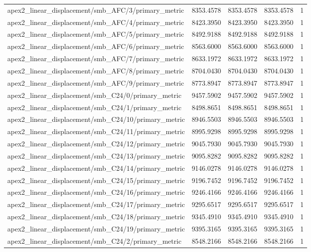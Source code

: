 \begin{table}[h]
\begin{tabular}{lrrrr}
apex2_linear_displacement/smb_AFC/3/primary_metric & 8353.4578 & 8353.4578 & 8353.4578 & 1 \\
apex2_linear_displacement/smb_AFC/4/primary_metric & 8423.3950 & 8423.3950 & 8423.3950 & 1 \\
apex2_linear_displacement/smb_AFC/5/primary_metric & 8492.9188 & 8492.9188 & 8492.9188 & 1 \\
apex2_linear_displacement/smb_AFC/6/primary_metric & 8563.6000 & 8563.6000 & 8563.6000 & 1 \\
apex2_linear_displacement/smb_AFC/7/primary_metric & 8633.1972 & 8633.1972 & 8633.1972 & 1 \\
apex2_linear_displacement/smb_AFC/8/primary_metric & 8704.0430 & 8704.0430 & 8704.0430 & 1 \\
apex2_linear_displacement/smb_AFC/9/primary_metric & 8773.8947 & 8773.8947 & 8773.8947 & 1 \\
apex2_linear_displacement/smb_C24/0/primary_metric & 9457.5902 & 9457.5902 & 9457.5902 & 1 \\
apex2_linear_displacement/smb_C24/1/primary_metric & 8498.8651 & 8498.8651 & 8498.8651 & 1 \\
apex2_linear_displacement/smb_C24/10/primary_metric & 8946.5503 & 8946.5503 & 8946.5503 & 1 \\
apex2_linear_displacement/smb_C24/11/primary_metric & 8995.9298 & 8995.9298 & 8995.9298 & 1 \\
apex2_linear_displacement/smb_C24/12/primary_metric & 9045.7930 & 9045.7930 & 9045.7930 & 1 \\
apex2_linear_displacement/smb_C24/13/primary_metric & 9095.8282 & 9095.8282 & 9095.8282 & 1 \\
apex2_linear_displacement/smb_C24/14/primary_metric & 9146.0278 & 9146.0278 & 9146.0278 & 1 \\
apex2_linear_displacement/smb_C24/15/primary_metric & 9196.7452 & 9196.7452 & 9196.7452 & 1 \\
apex2_linear_displacement/smb_C24/16/primary_metric & 9246.4166 & 9246.4166 & 9246.4166 & 1 \\
apex2_linear_displacement/smb_C24/17/primary_metric & 9295.6517 & 9295.6517 & 9295.6517 & 1 \\
apex2_linear_displacement/smb_C24/18/primary_metric & 9345.4910 & 9345.4910 & 9345.4910 & 1 \\
apex2_linear_displacement/smb_C24/19/primary_metric & 9395.3165 & 9395.3165 & 9395.3165 & 1 \\
apex2_linear_displacement/smb_C24/2/primary_metric & 8548.2166 & 8548.2166 & 8548.2166 & 1 \\

\end{tabular}
\end{table}
